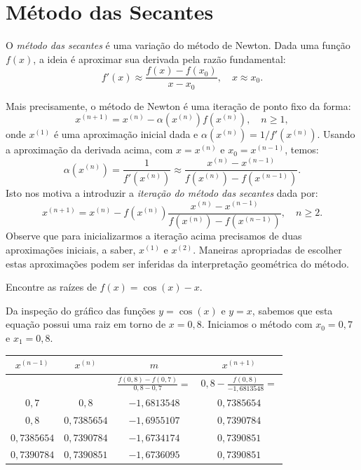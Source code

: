 \section{Método das Secantes}

O \emph{método das secantes} é uma variação do método de Newton. Dada uma função $f(x)$, a ideia é aproximar sua derivada pela razão fundamental:
\begin{equation*}
  f'(x)\approx \frac{f(x)-f(x_0)}{x-x_0},\quad x\approx x_0.
\end{equation*}

Mais precisamente, o método de Newton é uma iteração de ponto fixo da forma:
\begin{equation*}
  x^{(n+1)} = x^{(n)} - \alpha(x^{(n)})f(x^{(n)}),\quad n\geq 1,
\end{equation*}
onde $x^{(1)}$ é uma aproximação inicial dada e $\alpha(x^{(n)}) = 1/f'(x^{(n)})$. Usando a aproximação da derivada acima, com $x = x^{(n)}$ e $x_0 = x^{(n-1)}$, temos:
\begin{equation*}
  \alpha(x^{(n)}) = \frac{1}{f'(x^{(n)})} \approx  \frac{x^{(n)} - x^{(n-1)}}{f(x^{(n)}) - f(x^{(n-1)})}.
\end{equation*}
Isto nos motiva a introduzir a \emph{iteração do método das secantes} dada por:
\begin{equation*}
  x^{(n+1)} = x^{(n)} - f(x^{(n)})\frac{x^{(n)} - x^{(n-1)}}{f(x^{(n)}) - f(x^{(n-1)})},\quad n\geq 2.
\end{equation*}
Observe que para inicializarmos a iteração acima precisamos de duas aproximações iniciais, a saber, $x^{(1)}$ e $x^{(2)}$. Maneiras apropriadas de escolher estas aproximações podem ser inferidas da interpretação geométrica do método.

\begin{ex} Encontre as raízes de $f(x)=\cos(x)-x$.\end{ex}
\begin{sol}
Da inspeção do gráfico das funções $y=\cos(x)$ e $y=x$, sabemos que esta equação possui uma raiz em torno de $x=0,8$. Iniciamos o método com $x_0=0,7$ e $x_1=0,8$.
\begin{center}
\begin{tabular}{|c|c|c|c|}\hline
$x^{(n-1)}$ & $x^{(n)}$ & $m$ & $x^{(n+1)}$\\\hline
 & & $\frac{f(0,8)-f(0,7)}{0,8-0,7} =$ & $0,8- \frac{f(0,8)}{-1,6813548}=$\\
$0,7$ & $0,8$ & $-1,6813548$ & $0,7385654$\\\hline
$0,8$ & $0,7385654$ & $-1,6955107$ & $0,7390784$ \\\hline
 $0,7385654$ & $0,7390784$ &  $-1,6734174$ & $0,7390851$ \\\hline
$0,7390784$ & $0,7390851$ & $-1,6736095$ & $0,7390851$ \\\hline
\end{tabular}  
\end{center}  
\end{sol}

